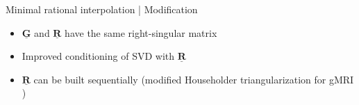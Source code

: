 \documentclass{beamer}
\begin{document}
\begin{frame}{Minimal rational interpolation | Modification}
    
    \begin{itemize}
        \item<2-> $\mathbf{\underline{G}}$ and $\mathbf{\underline{R}}$ have
        the same right-singular matrix
        \item<3-> Improved conditioning of SVD with $\mathbf{\underline{R}}$
        \item<4-> $\mathbf{\underline{R}}$ can be built sequentially (modified
        Householder triangularization for gMRI \cite{householder})
    \end{itemize}
    
\end{frame}
\end{document}
